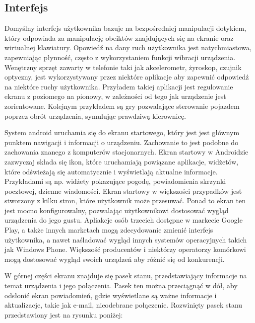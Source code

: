 \subsection{Interfejs}

Domyślny interfejs użytkownika bazuje na bezpośredniej manipulacji\cite{android:24} dotykiem, który odpowiada za manipulację obeiktów znajdujących się na ekranie oraz wirtualnej klawiatury. \cite{android:24} Opowiedź na dany ruch użytkownika jest natychmiastowa, zapewniając płynność, często z wykorzystaniem funkcji wibracji urządzenia. Wenętrzny sprzęt zawarty w telefonie taki jak akcelerometr, żyroskop, czujnik optyczny, jest wykorzystywany przez niektóre aplikacje aby zapewnić odpowiedź na niektóre ruchy użytkownika.\cite{android:25} Przyładem takiej aplikacji jest regulowanie ekranu z poziomego na pionowy, w zależności od tego jak urządzenie jest zorientowane. Kolejnym przykładem są gry pozwalające sterowanie pojazdem poprzez obrót urządzenia, symulując prawdziwą kierownicę.\cite{android:26}

System android uruchamia się do ekranu startowego, który jest jest głównym punktem nawigacji i informacji o urządzeniu. Zachowanie to jest podobne do zachowania znanego z komputerów stacjonarnych. Ekran startowy w Androidzie zazwyczaj składa się ikon, które uruchamiają powiązane aplikacje, widżetów, które odświeżają się automatycznie i wyświetlają aktualne informacje. Przykładami są np. widżety pokazujące pogodę, powiadomienia skrzynki pocztowej, dzienne wiadomości.\cite{android:27} Ekran startowy w większości przypadków jest stworzony z kilku stron, które użytkownik może przesuwać. Ponad to ekran ten jest mocno konfigurowalny, pozwalając użytkownikowi dostosować wygląd urządzenia do jego gustu.\cite{android:28} Apliakcje osób trzecich dostępne w markecie Google Play, a także innych marketach mogą zdecydowanie zmienić interfejs użytkownika, a nawet naśladować wygląd innych systemów operacyjnych takich jak Windows Phone.\cite{android:29} Większość producentów i niektórzy operatorzy komórkowi mogą dostosować wygląd swoich urządzeń aby różnić się od konkurencji. \cite{android:30}

W górnej części ekranu znajduje się pasek stanu, przedstawiający informacje na temat urządzenia i jego połączenia. Pasek ten można przeciągnąć w dół, aby odsłonić ekran powiadomień, gdzie wyświetlane są ważne informacje i aktualizacje, takie jak e-mail, nieodebrane połączenie. Rozwinięty pasek stanu przedstawiony jest na rysunku poniżej:

